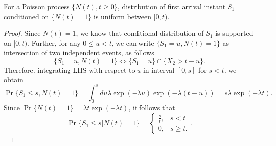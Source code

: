 \documentclass[a4paper,10pt]{article}
\begin{document}
\begin{prop} For a Poisson process $\{N(t), t\geqslant 0\}$, distribution of first arrival instant $S_1$ conditioned on $\{N(t)=1\}$ is uniform between $[0,t)$.
\end{prop}
\begin{proof} Since $N(t) = 1$, we know that conditional distribution of $S_1$ is supported on $[0,t)$. Further, for any $0 \leq u < t$, we can write $\{S_1 = u, N(t) = 1\}$ as intersection of two independent events, as follows
\begin{equation*}
\{S_1 = u, N(t) = 1\} \iff \{S_1 = u\}\cap\{X_2 > t - u\}.
\end{equation*}
Therefore, integrating LHS with respect to $u$ in interval $[0,s]$ for $s < t$, we obtain
\begin{equation*}
\Pr\{S_1 \leq s, N(t) = 1\} = \int_{0}^{s}du \lambda \exp(-\lambda u)\exp(-\lambda (t-u)) = s\lambda\exp(-\lambda t).
\end{equation*}
Since $\Pr\{N(t) = 1\} = \lambda t \exp(-\lambda t)$, it follows that 
\begin{equation*}
\Pr\{S_1 \leq s| N(t) = 1\} = \begin{cases}\frac{s}{t}, & s < t\\ 0, & s \geq t.\end{cases}.
\end{equation*}
\end{proof}
\end{document}
